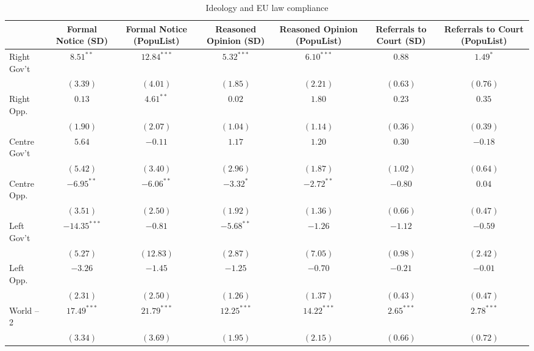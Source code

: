 
\begin{table}[htb]
\caption{Ideology and EU law compliance}
\begin{center}
\begin{tabular}{l c c c c c c}
\hline
 & Formal Notice (SD) & Formal Notice (PopuList) & Reasoned Opinion (SD) & Reasoned Opinion (PopuList) & Referrals to Court (SD) & Referrals to Court (PopuList) \\
\hline
Right Gov't    & $8.51^{**}$    & $12.84^{***}$ & $5.32^{***}$  & $6.10^{***}$  & $0.88$        & $1.49^{*}$    \\
               & $(3.39)$       & $(4.01)$      & $(1.85)$      & $(2.21)$      & $(0.63)$      & $(0.76)$      \\
Right Opp.     & $0.13$         & $4.61^{**}$   & $0.02$        & $1.80$        & $0.23$        & $0.35$        \\
               & $(1.90)$       & $(2.07)$      & $(1.04)$      & $(1.14)$      & $(0.36)$      & $(0.39)$      \\
Centre Gov't   & $5.64$         & $-0.11$       & $1.17$        & $1.20$        & $0.30$        & $-0.18$       \\
               & $(5.42)$       & $(3.40)$      & $(2.96)$      & $(1.87)$      & $(1.02)$      & $(0.64)$      \\
Centre Opp.    & $-6.95^{**}$   & $-6.06^{**}$  & $-3.32^{*}$   & $-2.72^{**}$  & $-0.80$       & $0.04$        \\
               & $(3.51)$       & $(2.50)$      & $(1.92)$      & $(1.36)$      & $(0.66)$      & $(0.47)$      \\
Left Gov't     & $-14.35^{***}$ & $-0.81$       & $-5.68^{**}$  & $-1.26$       & $-1.12$       & $-0.59$       \\
               & $(5.27)$       & $(12.83)$     & $(2.87)$      & $(7.05)$      & $(0.98)$      & $(2.42)$      \\
Left Opp.      & $-3.26$        & $-1.45$       & $-1.25$       & $-0.70$       & $-0.21$       & $-0.01$       \\
               & $(2.31)$       & $(2.50)$      & $(1.26)$      & $(1.37)$      & $(0.43)$      & $(0.47)$      \\
World -- 2     & $17.49^{***}$  & $21.79^{***}$ & $12.25^{***}$ & $14.22^{***}$ & $2.65^{***}$  & $2.78^{***}$  \\
               & $(3.34)$       & $(3.69)$      & $(1.95)$      & $(2.15)$      & $(0.66)$      & $(0.72)$      \\

\end{tabular}
\end{center}
\end{table}
